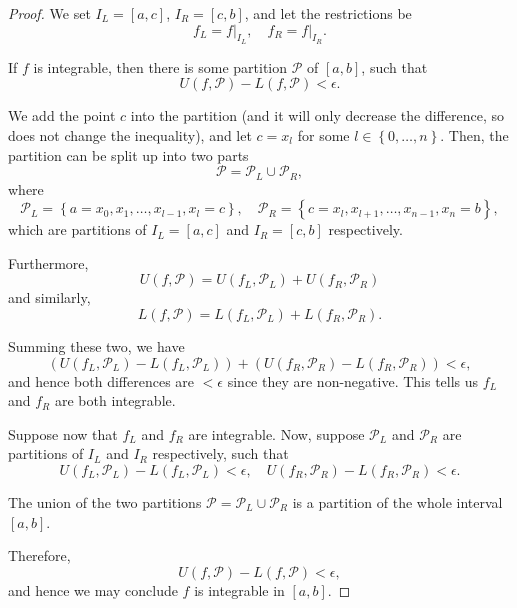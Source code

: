 \documentclass[11pt]{article}
\numberwithin{equation}{section}
\theoremstyle{definition}
\theoremstyle{remark}
\newcommand{\pqty}[1]{\left(#1\right)}
\newcommand{\Bqty}[1]{\left\{#1\right\}}
\newcommand{\ccintv}[2]{[#1,#2]}
\newcommand{\rightbar}[1]{\left.#1\right|}
\newcommand{\partition}{\mathcal P}
\newcommand{\upperSum}{U}
\newcommand{\lowerSum}{L}
\begin{document}
\begin{proof}
    We set \(I_L = \ccintv{a}{c}\), \(I_R = \ccintv{c}{b}\), and let the restrictions be
    \[
        f_L = \rightbar{f}_{I_L}, \quad f_R = \rightbar{f}_{I_R}.
    \]

    If \(f\) is integrable, then there is some partition \(\partition\) of \(\ccintv{a}{b}\), such that
    \[
        \upperSum\pqty{f, \partition} - \lowerSum\pqty{f, \partition} < \epsilon.
    \]

    We add the point \(c\) into the partition (and it will only decrease the difference, so does not change the inequality), and let \(c = x_l\) for some \(l \in \Bqty{0, \ldots, n}\). Then, the partition can be split up into two parts
    \[
        \partition = \partition_L \cup \partition_R,
    \]
    where
    \[
        \partition_L = \Bqty{a = x_0, x_1, \ldots, x_{l - 1}, x_l = c}, \quad \partition_R = \Bqty{c = x_l, x_{l + 1}, \ldots, x_{n - 1}, x_n = b},
    \]
    which are partitions of \(I_L = \ccintv{a}{c}\) and \(I_R = \ccintv{c}{b}\) respectively.
    
    Furthermore,
    \[
        \upperSum\pqty{f, \partition} = \upperSum\pqty{f_L, \partition_L} + \upperSum\pqty{f_R, \partition_R}
    \]
    and similarly,
    \[
        \lowerSum\pqty{f, \partition} = \lowerSum\pqty{f_L, \partition_L} + \lowerSum\pqty{f_R, \partition_R}.
    \]

    Summing these two, we have
    \[
        \pqty{\upperSum\pqty{f_L, \partition_L} - \lowerSum\pqty{f_L, \partition_L}} + \pqty{\upperSum\pqty{f_R, \partition_R} - \lowerSum\pqty{f_R, \partition_R}} < \epsilon,
    \]
    and hence both differences are \(< \epsilon\) since they are non-negative. This tells us \(f_L\) and \(f_R\) are both integrable.

    Suppose now that \(f_L\) and \(f_R\) are integrable. Now, suppose \(\partition_L\) and \(\partition_R\) are partitions of \(I_L\) and \(I_R\) respectively, such that
    \[
        \upperSum\pqty{f_L, \partition_L} - \lowerSum\pqty{f_L, \partition_L} < \epsilon, \quad \upperSum\pqty{f_R, \partition_R} - \lowerSum\pqty{f_R, \partition_R} < \epsilon.
    \]

    The union of the two partitions \(\partition = \partition_L \cup \partition_R\) is a partition of the whole interval \(\ccintv{a}{b}\).

    Therefore,
    \[
        \upperSum\pqty{f, \partition} - \lowerSum\pqty{f, \partition} < \epsilon,
    \]
    and hence we may conclude \(f\) is integrable in \(\ccintv{a}{b}\).


\end{proof}
\end{document}
